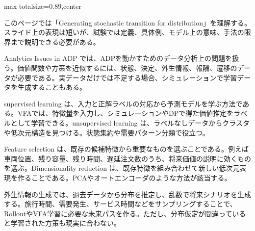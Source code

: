 \begin{minipage}[t]{0.58\textwidth}
\begin{adjustbox}{max totalsize={\textwidth}{0.89\textheight},center}
\begin{minipage}{\textwidth}\scriptsize
{}このページでは「Generating stochastic transition for distribution」を理解する。スライド上の表現は短いが、試験では定義、具体例、モデル上の意味、手法の限界まで説明できる必要がある。\par
Analytics Issues in ADP では、ADPを動かすためのデータ分析上の問題を扱う。価値関数や方策を近似するには、状態、決定、外生情報、報酬、遷移のデータが必要である。実データだけでは不足する場合、シミュレーションで学習データを生成することもある。\par
supervised learning は、入力と正解ラベルの対応から予測モデルを学ぶ方法である。VFAでは、特徴量を入力し、シミュレーションやDPで得た価値推定をラベルとして学習できる。unsupervised learning は、ラベルなしデータからクラスタや低次元構造を見つける。状態集約や需要パターン分類で役立つ。\par
Feature selection は、既存の候補特徴から重要なものを選ぶことである。例えば車両位置、残り容量、残り時間、遅延注文数のうち、将来価値の説明に効くものを選ぶ。Dimensionality reduction は、既存特徴を組み合わせて新しい低次元表現を作ることである。PCAやオートエンコーダのような方法が該当する。\par
外生情報の生成では、過去データから分布を推定し、乱数で将来シナリオを生成する。旅行時間、需要発生、サービス時間などをサンプリングすることで、RolloutやVFA学習に必要な未来パスを作る。ただし、分布仮定が間違っていると学習された方策も現実に合わない。\par

\end{minipage}
\end{adjustbox}
\end{minipage}
